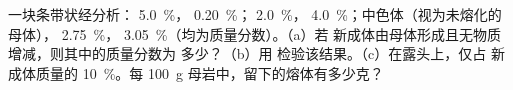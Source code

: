 \begin{exercise}[$\star\star\star$]\label{exo:b2:crustal-melting:12}
一块条带状经分析：  \qty{5.0}{\percent}，
\qty{0.20}{\percent}；  \qty{2.0}{\percent}，
\qty{4.0}{\percent}；中色体（视为未熔化的母体），
\qty{2.75}{\percent}， \qty{3.05}{\percent}（均为质量分数）。（a）若
新成体由母体形成且无物质增减，则其中的质量分数为
多少？（b）用  检验该结果。（c）在露头上，仅占
新成体质量的 \qty{10}{\percent}。每
\qty{100}{\gram} 母岩中，留下的熔体有多少克？
\end{exercise}

